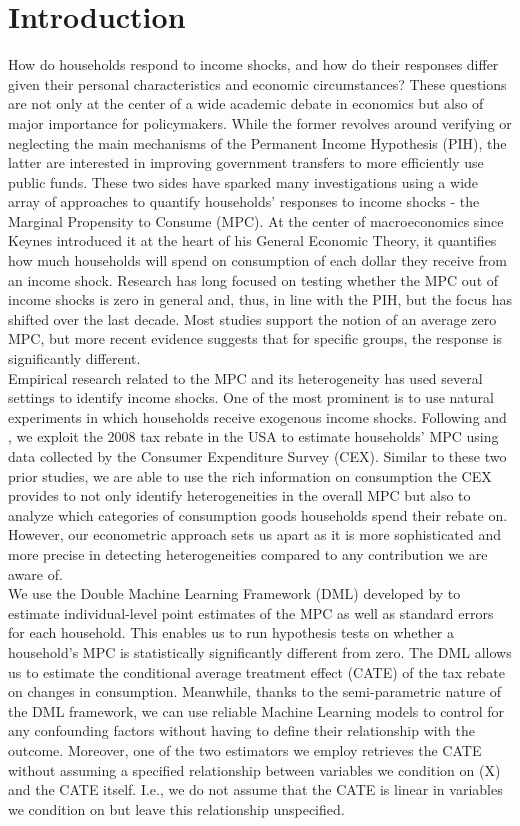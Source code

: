 \section{Introduction} \label{sec:intro}
How do households respond to income shocks, and how do their responses differ given their personal characteristics and economic circumstances? These questions are not only at the center of a wide academic debate in economics but also of major importance for policymakers. While the former revolves around verifying or neglecting the main mechanisms of the Permanent Income Hypothesis (PIH), the latter are interested in improving government transfers to more efficiently use public funds. These two sides have sparked many investigations using a wide array of approaches to quantify households' responses to income shocks - the Marginal Propensity to Consume (MPC). At the center of macroeconomics since Keynes introduced it at the heart of his General Economic Theory, it quantifies how much households will spend on consumption of each dollar they receive from an income shock. Research has long focused on testing whether the MPC out of income shocks is zero in general and, thus, in line with the PIH, but the focus has shifted over the last decade. Most studies support the notion of an average zero MPC, but more recent evidence suggests that for specific groups, the response is significantly different. \\
Empirical research related to the MPC and its heterogeneity has used several settings to identify income shocks. One of the most prominent is to use natural experiments in which households receive exogenous income shocks. Following \cite{parker_etal_13} and \cite{ms_14}, we exploit the 2008 tax rebate in the USA to estimate households' MPC using data collected by the Consumer Expenditure Survey (CEX). Similar to these two prior studies, we are able to use the rich information on consumption the CEX provides to not only identify heterogeneities in the overall MPC but also to analyze which categories of consumption goods households spend their rebate on. However, our econometric approach sets us apart as it is more sophisticated and more precise in detecting heterogeneities compared to any contribution we are aware of. \\ 
We use the Double Machine Learning Framework (DML) developed by \cite{DML2017} to estimate individual-level point estimates of the MPC as well as standard errors for each household. This enables us to run hypothesis tests on whether a household's MPC is statistically significantly different from zero. The DML allows us to estimate the conditional average treatment effect (CATE) of the tax rebate on changes in consumption. Meanwhile, thanks to the semi-parametric nature of the DML framework, we can use reliable Machine Learning models to control for any confounding factors without having to define their relationship with the outcome. Moreover, one of the two estimators we employ retrieves the CATE without assuming a specified relationship between variables we condition on (X) and the CATE itself. I.e., we do not assume that the CATE is linear in variables we condition on but leave this relationship unspecified. \\
